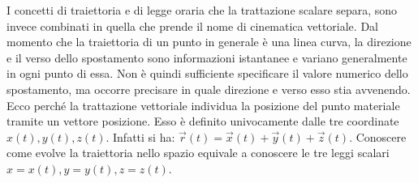 \documentclass[10pt,a4paper]{book}
\begin{document}
I concetti di traiettoria e di legge oraria che la trattazione scalare separa, sono invece combinati in quella che prende il nome di cinematica vettoriale. Dal momento che la traiettoria di un punto in generale è una linea curva, la direzione e il verso dello spostamento sono informazioni istantanee e variano generalmente in ogni punto di essa. Non è quindi sufficiente specificare il valore numerico dello spostamento, ma occorre precisare in quale direzione e verso esso stia avvenendo. Ecco perché la trattazione vettoriale individua la posizione del punto materiale tramite un vettore posizione. Esso è definito univocamente dalle tre coordinate $x(t), y(t), z(t)$. Infatti si ha: $\vec{r}(t)=\vec{x}(t)+\vec{y}(t)+\vec{z}(t)$. Conoscere come evolve la traiettoria nello spazio equivale a conoscere le tre leggi scalari $x=x(t), y=y(t), z=z(t)$.
\end{document}
